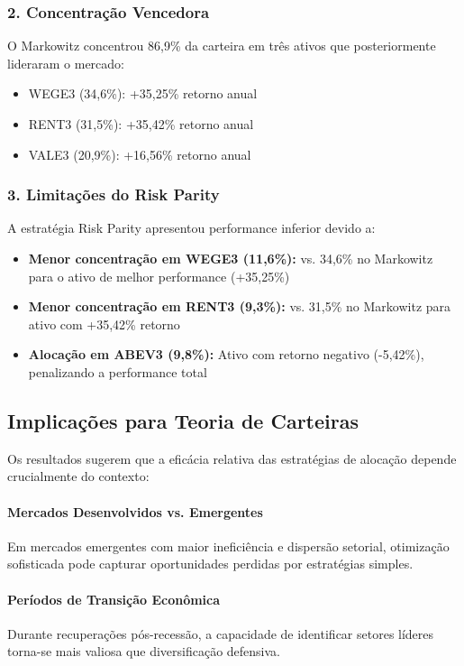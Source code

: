 \subsubsection{2. Concentração Vencedora}
O Markowitz concentrou 86,9\% da carteira em três ativos que posteriormente lideraram o mercado:
\begin{itemize}
    \item WEGE3 (34,6\%): +35,25\% retorno anual
    \item RENT3 (31,5\%): +35,42\% retorno anual  
    \item VALE3 (20,9\%): +16,56\% retorno anual
\end{itemize}

\subsubsection{3. Limitações do Risk Parity}
A estratégia Risk Parity apresentou performance inferior devido a:
\begin{itemize}
    \item \textbf{Menor concentração em WEGE3 (11,6\%):} vs. 34,6\% no Markowitz para o ativo de melhor performance (+35,25\%)
    \item \textbf{Menor concentração em RENT3 (9,3\%):} vs. 31,5\% no Markowitz para ativo com +35,42\% retorno
    \item \textbf{Alocação em ABEV3 (9,8\%):} Ativo com retorno negativo (-5,42\%), penalizando a performance total
\end{itemize}

\subsection{Implicações para Teoria de Carteiras}

Os resultados sugerem que a eficácia relativa das estratégias de alocação depende crucialmente do contexto:

\paragraph{Mercados Desenvolvidos vs. Emergentes}
Em mercados emergentes com maior ineficiência e dispersão setorial, otimização sofisticada pode capturar oportunidades perdidas por estratégias simples.

\paragraph{Períodos de Transição Econômica}
Durante recuperações pós-recessão, a capacidade de identificar setores líderes torna-se mais valiosa que diversificação defensiva.

